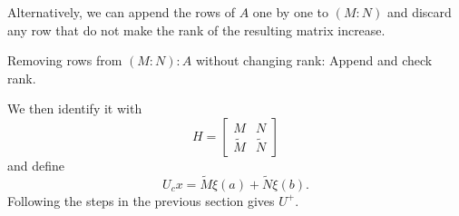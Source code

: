 \documentclass[11pt, oneside, a4paper]{article}
\begin{document}

Alternatively, we can append the rows of $A$ one by one to $(M:N)$ and discard any row that do not make the rank of the resulting matrix increase.

\begin{algorithm}[H]
    \caption{Removing rows from $(M:N):A$ without changing rank: Append and check rank.}\label{algo:removing rows from (M:N):A without changing rank by checking rank: apppend and check rank.}
\end{algorithm}


We then identify it with
\[H = \begin{bmatrix}M&N\\ \tilde{M} & \tilde{N}\end{bmatrix}\]
and define
\[U_c x = \tilde{M}\xi(a) + \tilde{N}\xi(b).\]
Following the steps in the previous section gives $U^+$.
\end{document}
